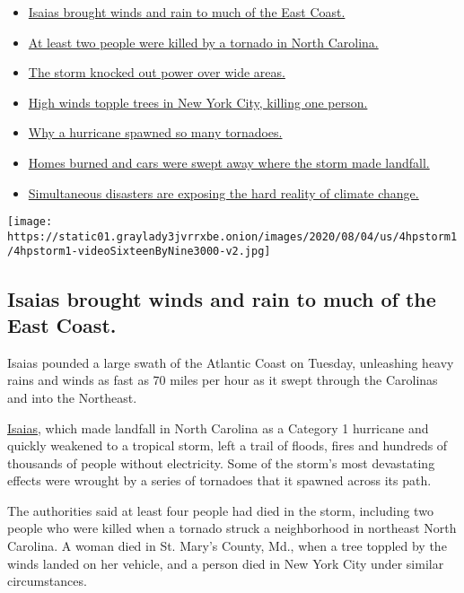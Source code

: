 \begin{itemize}
\tightlist
\item
  \protect\hyperlink{link-38d68049}{Isaias brought winds and rain to
  much of the East Coast.}
\item
  \protect\hyperlink{link-7961bdbc}{At least two people were killed by a
  tornado in North Carolina.}
\item
  \protect\hyperlink{link-3480f4a1}{The storm knocked out power over
  wide areas.}
\item
  \protect\hyperlink{link-2673c54}{High winds topple trees in New York
  City, killing one person.}
\item
  \protect\hyperlink{link-5275f1d1}{Why a hurricane spawned so many
  tornadoes.}
\item
  \protect\hyperlink{link-5066ef1c}{Homes burned and cars were swept
  away where the storm made landfall.}
\item
  \protect\hyperlink{link-665175e7}{Simultaneous disasters are exposing
  the hard reality of climate change.}
\end{itemize}

\texttt{[image: https://static01.graylady3jvrrxbe.onion/images/2020/08/04/us/4hpstorm1/4hpstorm1-videoSixteenByNine3000-v2.jpg]}

\hypertarget{isaias-brought-winds-and-rain-to-much-of-the-east-coast}{%
\subsection{Isaias brought winds and rain to much of the East
Coast.}\label{isaias-brought-winds-and-rain-to-much-of-the-east-coast}}

Isaias pounded a large swath of the Atlantic Coast on Tuesday,
unleashing heavy rains and winds as fast as 70 miles per hour as it
swept through the Carolinas and into the Northeast.

\href{https://www.nytimes3xbfgragh.onion/2020/08/05/nyregion/isaias-hurricane-storm-damage-ny-nj.html}{Isaias},
which made landfall in North Carolina as a Category 1 hurricane and
quickly weakened to a tropical storm, left a trail of floods, fires and
hundreds of thousands of people without electricity. Some of the storm's
most devastating effects were wrought by a series of tornadoes that it
spawned across its path.

The authorities said at least four people had died in the storm,
including two people who were killed when a tornado struck a
neighborhood in northeast North Carolina. A woman died in St. Mary's
County, Md., when a tree toppled by the winds landed on her vehicle, and
a person died in New York City under similar circumstances.

